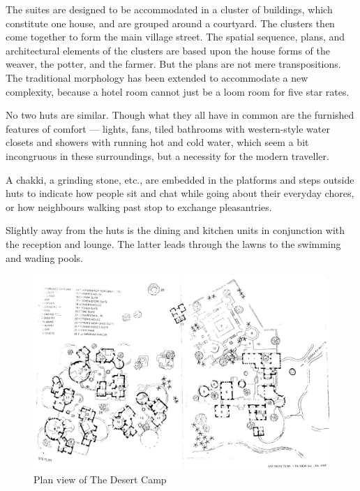 The suites are designed to be accommodated in a cluster of buildings, which constitute one house, and are grouped around a courtyard. The clusters then come together to form the main village street. The spatial sequence, plans, and architectural elements of the clusters are based upon the house forms of the weaver, the potter, and the farmer. But the plans are not mere transpositions. The traditional morphology has been extended to accommodate a new complexity, because a hotel room cannot just be a loom room for five star rates.

No two huts are similar. Though what they all have in common are the furnished features of comfort --- lights, fans, tiled bathrooms with western-style water closets and showers with running hot and cold water, which seem a bit incongruous in these surroundings, but a necessity for the modern traveller.

A chakki, a grinding stone, etc., are embedded in the platforms and steps outside huts to indicate how people sit and chat while going about their everyday chores, or how neighbours walking past stop to exchange pleasantries.

Slightly away from the huts is the dining and kitchen units in conjunction with the reception and lounge. The latter leads through the lawns to the swimming and wading pools.

\begin{figure}[H]
  \centering
  \includegraphics[angle=90,width=1.0\textwidth]{img/dc-02}
  \caption{Plan view of The Desert Camp}
  \label{fig:dc-02} 
\end{figure}

